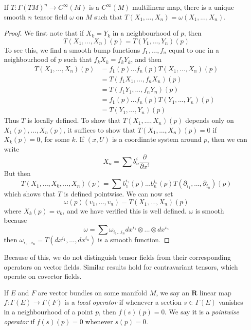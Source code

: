 \begin{theorem}
    If $T: \Gamma(TM)^n \to C^\infty(M)$ is a $C^\infty(M)$ multilinear map, there is a unique smooth $n$ tensor field $\omega$ on $M$ such that $T(X_1, \dots, X_n) = \omega(X_1, \dots, X_n)$.
\end{theorem}
\begin{proof}
    We first note that if $X_k = Y_k$ in a neighbourhood of $p$, then
    \[ T(X_1, \dots, X_n)(p) = T(Y_1, \dots, Y_n)(p) \]
    To see this, we find a smooth bump functions $f_1, \dots, f_n$ equal to one in a neighbourhood of $p$ such that $f_kX_k = f_kY_k$, and then
    \begin{align*}
        T(X_1, \dots, X_n)(p) &= f_1(p) \dots f_n(p) T(X_1, \dots, X_n)(p)\\
        &= T(f_1X_1, \dots, f_nX_n)(p)\\
        &= T(f_1Y_1, \dots, f_nY_n)(p)\\
        &= f_1(p) \dots f_n(p) T(Y_1, \dots, Y_n)(p)\\
        &= T(Y_1, \dots, Y_n)(p)
    \end{align*}
    Thus $T$ is locally defined. To show that $T(X_1, \dots, X_n)(p)$ depends only on $X_1(p), \dots, X_n(p)$, it suffices to show that $T(X_1, \dots, X_n)(p) = 0$ if $X_k(p) = 0$, for some $k$. If $(x,U)$ is a coordinate system around $p$, then we can write
    \[ X_n = \sum b_n^i \frac{\partial}{\partial x^i} \]
    But then
    \[ T(X_1, \dots, X_k, \dots, X_n)(p) = \sum b_1^{i_1}(p) \dots b_n^{i_n}(p) T \left(\partial_{i_1}, \dots, \partial_{i_n} \right)(p) \]
    which shows that $T$ is defined pointwise. We can now set
    \[ \omega(p)(v_1, \dots, v_n) = T(X_1, \dots, X_n)(p) \]
    where $X_k(p) = v_k$, and we have verified this is well defined. $\omega$ is smooth because
    \[ \omega = \sum \omega_{i_1 \dots i_n} dx^{i_1} \otimes \dots \otimes dx^{i_n} \]
    then $\omega_{i_1 \dots i_n} = T(dx^{i_1}, \dots, dx^{i_n})$ is a smooth function.
\end{proof}

Because of this, we do not distinguish tensor fields from their corresponding operators on vector fields. Similar results hold for contravariant tensors, which operate on covector fields.

If $E$ and $F$ are vector bundles on some manifold $M$, we say an $\mathbf{R}$ linear map $f: \Gamma(E) \to \Gamma(F)$ is a \emph{local operator} if whenever a section $s \in \Gamma(E)$ vanishes in a neighbourhood of a point $p$, then $f(s)(p) = 0$. We say it is a \emph{pointwise operator} if $f(s)(p) = 0$ whenever $s(p) = 0$.

